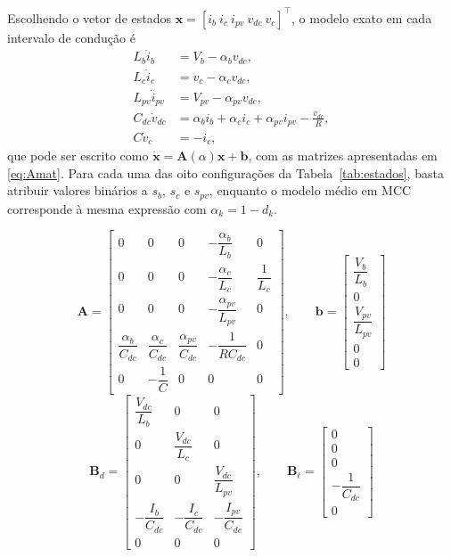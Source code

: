 Escolhendo o vetor de estados $\mathbf{x}=[i_b\ i_c\ i_{pv}\ v_{dc}\ v_c]^\top$, o modelo exato em cada intervalo de condução é
\begin{align}
L_b\dot i_b&=V_b-\alpha_b v_{dc},\nonumber\\
L_c\dot i_c&=v_c-\alpha_c v_{dc},\nonumber\\
L_{pv}\dot i_{pv}&=V_{pv}-\alpha_{pv} v_{dc},\label{eq:chav}\\
C_{dc}\dot v_{dc}&=\alpha_b i_b+\alpha_c i_c+\alpha_{pv} i_{pv}-\frac{v_{dc}}{R},\nonumber\\
C\dot v_c&=-i_c,\nonumber
\end{align}
que pode ser escrito como $\dot{\mathbf{x}}=\mathbf{A}(\alpha)\mathbf{x}+\mathbf{b}$, com as matrizes apresentadas em \eqref{eq:Amat}. Para cada uma das oito configurações da Tabela~\ref{tab:estados}, basta atribuir valores binários a $s_b$, $s_c$ e $s_{pv}$, enquanto o modelo médio em MCC corresponde à mesma expressão com $\alpha_k=1-d_k$.


\begingroup
\footnotesize
\setlength{\arraycolsep}{2.5pt}
\begin{equation}
\mathbf{A}=\begin{bmatrix}
0&0&0&-\dfrac{\alpha_b}{L_b}&0\\[7pt]
0&0&0&-\dfrac{\alpha_c}{L_c}&\dfrac1{L_c}\\[7pt]
0&0&0&-\dfrac{\alpha_{pv}}{L_{pv}}&0\\[7pt]
\dfrac{\alpha_b}{C_{dc}}&\dfrac{\alpha_c}{C_{dc}}&\dfrac{\alpha_{pv}}{C_{dc}}&-\dfrac1{RC_{dc}}&0\\[7pt]
0&-\dfrac1C&0&0&0
\end{bmatrix},\qquad
\mathbf{b}=\begin{bmatrix}\dfrac{V_b}{L_b}\\[7pt]0\\[7pt]\dfrac{V_{pv}}{L_{pv}}\\[7pt]0\\[7pt]0\end{bmatrix}
\label{eq:Amat}
\end{equation}
\begin{equation}
\mathbf{B}_d=\begin{bmatrix}
\dfrac{V_{dc}}{L_b}&0&0\\[7pt]
0&\dfrac{V_{dc}}{L_c}&0\\[7pt]
0&0&\dfrac{V_{dc}}{L_{pv}}\\[7pt]
-\dfrac{I_b}{C_{dc}}&-\dfrac{I_c}{C_{dc}}&-\dfrac{I_{pv}}{C_{dc}}\\[7pt]
0&0&0
\end{bmatrix},\qquad
\mathbf{B}_\ell=\begin{bmatrix}0\\0\\0\\-\dfrac1{C_{dc}}\\0\end{bmatrix}
\label{eq:Bmat}
\end{equation}
\endgroup

